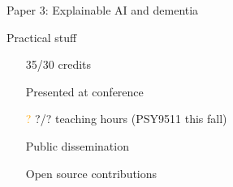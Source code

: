 \documentclass[9pt]{beamer}
\begin{document}
\begin{frame}{Paper 3: Explainable AI and dementia}
	\end{frame}

	\begin{frame}{Practical stuff}
		\begin{itemize}
			\item[\textcolor{green}{\checkmark}] 35/30 credits
			\item[\textcolor{green}{\checkmark}] Presented at conference
			\item[\textcolor{orange}{?}] ?/? teaching hours (PSY9511 this fall)
			\item[\textcolor{green}{\checkmark}] Public dissemination
			\item[\textcolor{green}{\checkmark}] Open source contributions
		\end{itemize}
	\end{frame}
\end{document}
